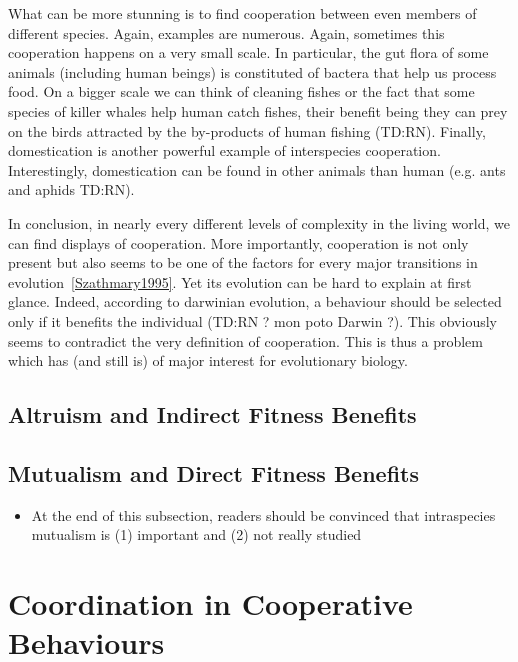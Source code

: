     What can be more stunning is to find cooperation between even members of different species. Again, examples are numerous. Again, sometimes this cooperation happens on a very small scale. In particular, the gut flora of some animals (including human beings) is constituted of bactera that help us process food. On a bigger scale we can think of cleaning fishes or the fact that some species of killer whales help human catch fishes, their benefit being they can prey on the birds attracted by the by-products of human fishing (TD:RN). Finally, domestication is another powerful example of interspecies cooperation. Interestingly, domestication can be found in other animals than human (e.g. ants and aphids TD:RN).

    In conclusion, in nearly every different levels of complexity in the living world, we can find displays of cooperation. More importantly, cooperation is not only present but also seems to be one of the factors for every major transitions in evolution~\ref{Szathmary1995}. Yet its evolution can be hard to explain at first glance. Indeed, according to darwinian evolution, a behaviour should be selected only if it benefits the individual (TD:RN ? mon poto Darwin ?). This obviously seems to contradict the very definition of cooperation. This is thus a problem which has (and still is) of major interest for evolutionary biology.



  \subsection{Altruism and Indirect Fitness Benefits}

  \subsection{Mutualism and Direct Fitness Benefits}
    \begin{itemize}
      \item{At the end of this subsection, readers should be convinced that intraspecies mutualism is (1) important and (2) not really studied}
    \end{itemize}


\section{Coordination in Cooperative Behaviours}
  
